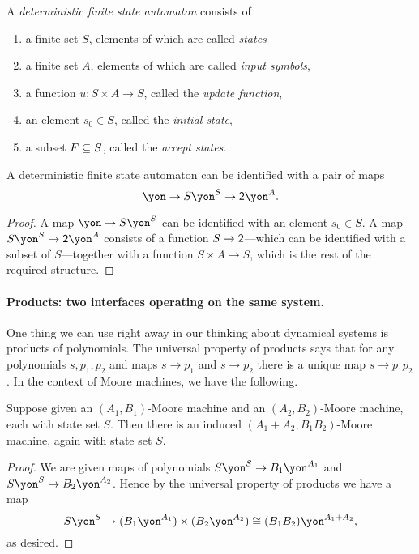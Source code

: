 \documentclass[Book-Poly]{subfiles}
\begin{document}
\begin{definition}\label{def.dfa}
A \emph{deterministic finite state automaton} consists of
\begin{enumerate}
	\item a finite set $S$, elements of which are called \emph{states}
	\item a finite set $A$, elements of which are called \emph{input symbols},
	\item a function $u\colon S\times A\to S$, called the \emph{update function},
	\item an element $s_0\in S$, called the \emph{initial state},
	\item a subset $F\ss S$, called the \emph{accept states}.
\end{enumerate}
\end{definition}

\begin{proposition}
A deterministic finite state automaton can be identified with a pair of maps
\[
\yon\to S\yon^S\to \2\yon^A.
\]
\end{proposition}
\begin{proof}
A map $\yon\to S\yon^S$ can be identified with an element $s_0\in S$. A map $S\yon^S\to\2\yon^A$ consists of a function $S\to\2$---which can be identified with a subset of $S$---together with a function $S\times A\to S$, which is the rest of the required structure.
\end{proof}


\paragraph{Products: two interfaces operating on the same system.}

One thing we can use right away in our thinking about dynamical systems is products of polynomials. The universal property of products says that for any polynomials $s,p_1,p_2$ and maps $s\to p_1$ and $s\to p_2$ there is a unique map $s\to p_1p_2$. In the context of Moore machines, we have the following.

\begin{proposition}
Suppose given an $(A_1,B_1)$-Moore machine and an $(A_2,B_2)$-Moore machine, each with state set $S$. Then there is an induced $(A_1+A_2,B_1B_2)$-Moore machine, again with state set $S$.
\end{proposition}
\begin{proof}
We are given maps of polynomials $S\yon^S\to B_1\yon^{A_1}$ and $S\yon^S\to B_2\yon^{A_2}$. Hence by the universal property of products we have a map
\[
  S\yon^S\to
  (B_1\yon^{A_1})\times(B_2\yon^{A_2})
  \cong(B_1B_2)\yon^{A_1+A_2},
\] 
as desired.
\end{proof}
\end{document}
